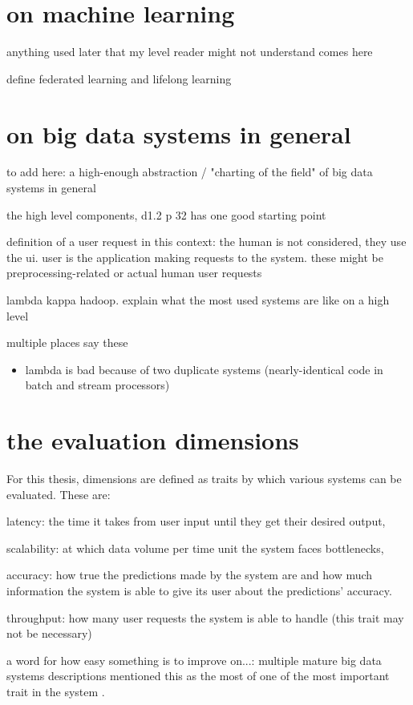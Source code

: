 \section{on machine learning}

anything used later that my level reader might not understand comes here

define federated learning and lifelong learning

\section{on big data systems in general}

to add here: a high-enough abstraction / "charting of the field" of big data systems in general

the high level components, d1.2 p 32 has one good starting point

definition of a user request in this context: the human is not considered, they use the ui. user is the application making requests to the system. these might be preprocessing-related or actual human user requests

lambda kappa hadoop. explain what the most used systems are like on a high level

multiple places say these
\begin{itemize}
    \item lambda is bad because of two duplicate systems (nearly-identical code in batch and stream processors)
\end{itemize}

\section{the evaluation dimensions}

For this thesis, dimensions are defined as traits by which various systems can be evaluated. These are:

latency: the time it takes from user input until they get their desired output,

scalability: at which data volume per time unit the system faces bottlenecks,

accuracy: how true the predictions made by the system are and how much information the system is able to give its user about the predictions' accuracy.

throughput: how many user requests the system is able to handle (this trait may not be necessary)

a word for how easy something is to improve on...: multiple mature big data systems descriptions mentioned this as the most of one of the most important trait in the system \cite{uber} \cite{facebook}.

